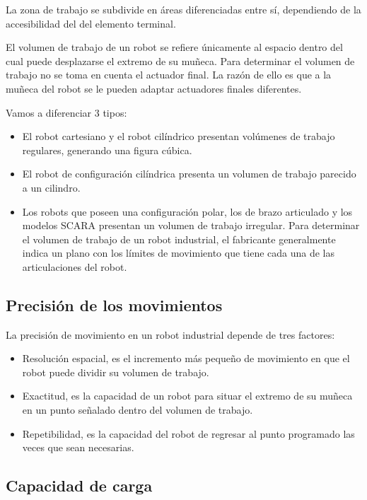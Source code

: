 \documentclass[12pt,a4paper]{report}
\begin{document}
La zona de trabajo se subdivide en áreas diferenciadas entre sí, dependiendo de
la accesibilidad del del elemento terminal.

El volumen de trabajo de un robot se refiere únicamente al espacio dentro del
cual puede desplazarse el extremo de su muñeca. Para determinar el volumen de
trabajo no se toma en cuenta el actuador final. La razón de ello es que a la
muñeca del robot se le pueden adaptar actuadores finales diferentes.

Vamos a diferenciar 3 tipos:
\begin{itemize}
    \item El robot cartesiano y el robot cilíndrico presentan volúmenes de
    trabajo regulares, generando una figura cúbica.
    \item El robot de configuración cilíndrica presenta un volumen de trabajo
    parecido a un cilindro.
    \item Los robots que poseen una configuración polar, los de brazo articulado
    y los modelos SCARA presentan un volumen de trabajo irregular. Para
    determinar el volumen de trabajo de un robot industrial, el fabricante
    generalmente indica un plano con los límites de movimiento que tiene cada
    una de las articulaciones del robot.
\end{itemize}


\subsection{Precisión de los movimientos}

La precisión de movimiento en un robot industrial depende de tres factores:

\begin{itemize}
    \item Resolución espacial, es el incremento más pequeño de movimiento en que
    el robot puede dividir su volumen de trabajo. 
    \item Exactitud, es la capacidad de un robot para situar el extremo de su
    muñeca en un punto señalado dentro del volumen de trabajo.
    \item Repetibilidad, es la capacidad del robot de regresar al punto
    programado las veces que sean necesarias. 
\end{itemize}


\subsection{Capacidad de carga}
\end{document}
